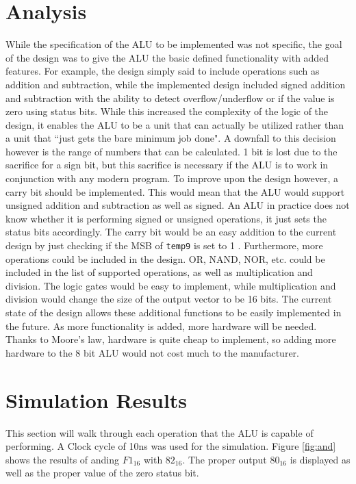 \documentclass[12pt]{article}
\begin{document}
\section{Analysis}
While the specification of the ALU to be implemented was not specific, the goal of the design was to give the ALU the basic defined functionality with added features. For example, the design simply said to include operations such as addition and subtraction, while the implemented design included signed addition and subtraction with the ability to detect overflow/underflow or if the value is zero using status bits. While this increased the complexity of the logic of the design, it enables the ALU to be a unit that can actually be utilized rather than a unit that ``just gets the bare minimum job done". A downfall to this decision however is the range of numbers that can be calculated. 1 bit is lost due to the sacrifice for a sign bit, but this sacrifice is necessary if the ALU is to work in conjunction with any modern program. To improve upon the design however, a carry bit should be implemented. This would mean that the ALU would support unsigned addition and subtraction as well as signed. An ALU in practice does not know whether it is performing signed or unsigned operations, it just sets the status bits accordingly. The carry bit would be an easy addition to the current design by just checking if the MSB of \texttt{temp9} is set to 1 . Furthermore, more operations could be included in the design. OR, NAND, NOR, etc. could be included in the list of supported operations, as well as multiplication and division. The logic gates would be easy to implement, while multiplication and division would change the size of the output vector to be 16 bits. The current state of the design allows these additional functions to be easily implemented in the future. As more functionality is added, more hardware will be needed. Thanks to Moore's law, hardware is quite cheap to implement, so adding more hardware to the 8 bit ALU would not cost much to the manufacturer.
\section{Simulation Results}
This section will walk through each operation that the ALU is capable of performing. A Clock cycle of 10ns was used for the simulation. Figure \ref{fig:and} shows the results of anding $F1_{16}$ with $82_{16}$. The proper output $80_{16}$ is displayed as well as the proper value of the zero status bit. 
\end{document}
